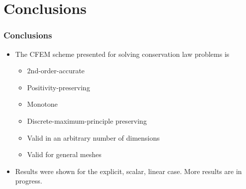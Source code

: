 \documentclass{beamer}
\begin{document}
\section{Conclusions}
\begin{frame}
\frametitle{Conclusions}

\begin{itemize}
   \item The CFEM scheme presented for solving conservation law problems is
   \begin{itemize}
      \item 2nd-order-accurate
      \item Positivity-preserving
      \item Monotone
      \item Discrete-maximum-principle preserving
      \item Valid in an arbitrary number of dimensions
      \item Valid for general meshes
   \end{itemize}
   \item Results were shown for the explicit, scalar, linear case. More results
      are in progress.
\end{itemize}

\end{frame}
\end{document}
